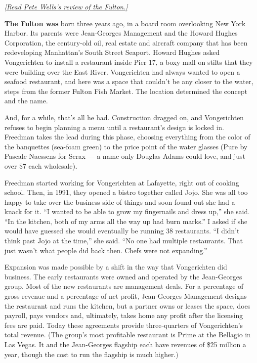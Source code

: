 \href{https://www.nytimes3xbfgragh.onion/2019/07/30/dining/the-fulton-review-pete-wells-jean-georges.html}{\emph{{[}Read
Pete Wells's review of the Fulton.{]}}}

\textbf{The Fulton was} born three years ago, in a board room
overlooking New York Harbor. Its parents were Jean-Georges Management
and the Howard Hughes Corporation, the century-old oil, real estate and
aircraft company that has been redeveloping Manhattan's South Street
Seaport. Howard Hughes asked Vongerichten to install a restaurant inside
Pier 17, a boxy mall on stilts that they were building over the East
River. Vongerichten had always wanted to open a seafood restaurant, and
here was a space that couldn't be any closer to the water, steps from
the former Fulton Fish Market. The location determined the concept and
the name.

And, for a while, that's all he had. Construction dragged on, and
Vongerichten refuses to begin planning a menu until a restaurant's
design is locked in. Freedman takes the lead during this phase, choosing
everything from the color of the banquettes (sea-foam green) to the
price point of the water glasses (Pure by Pascale Naessens for Serax ---
a name only Douglas Adams could love, and just over \$7 each wholesale).

Freedman started working for Vongerichten at Lafayette, right out of
cooking school. Then, in 1991, they opened a bistro together called
Jojo. She was all too happy to take over the business side of things and
soon found out she had a knack for it. ``I wanted to be able to grow my
fingernails and dress up,'' she said. ``In the kitchen, both of my arms
all the way up had burn marks.'' I asked if she would have guessed she
would eventually be running 38 restaurants. ``I didn't think past Jojo
at the time,'' she said. ``No one had multiple restaurants. That just
wasn't what people did back then. Chefs were not expanding.''

Expansion was made possible by a shift in the way that Vongerichten did
business. The early restaurants were owned and operated by the
Jean-Georges group. Most of the new restaurants are management deals.
For a percentage of gross revenue and a percentage of net profit,
Jean-Georges Management designs the restaurant and runs the kitchen, but
a partner owns or leases the space, does payroll, pays vendors and,
ultimately, takes home any profit after the licensing fees are paid.
Today these agreements provide three-quarters of Vongerichten's total
revenue. (The group's most profitable restaurant is Prime at the
Bellagio in Las Vegas. It and the Jean-Georges flagship each have
revenues of \$25 million a year, though the cost to run the flagship is
much higher.)

